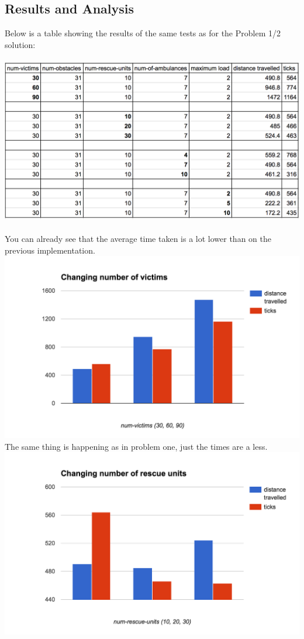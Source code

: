 \documentclass[titlepage]{article}
\begin{document}
  \subsection{Results and Analysis}
    Below is a table showing the results of the same tests as for the Problem 1/2 solution:
    \\
    \\
    \includegraphics[width=\textwidth,height=\textheight,keepaspectratio]{2table.png}
    \\
    \\
    You can already see that the average time taken is a lot lower than on the previous implementation.
    \\
    \includegraphics[width=\textwidth,height=\textheight,keepaspectratio]{2victims.png}
    \\
    The same thing is happening as in problem one, just the times are a less.
    \\
    \includegraphics[width=\textwidth,height=\textheight,keepaspectratio]{2rescueunits.png}
\end{document}
